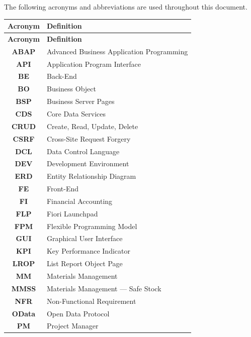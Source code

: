 \documentclass[12pt,a4paper]{report}
\begin{document}
The following acronyms and abbreviations are used throughout this document.

\begin{longtable}{|c|p{10cm}|}
  \hline
  \rowcolor{tableheadpeach}
  \textbf{Acronym} & \textbf{Definition} \\
  \hline
  \endfirsthead
  \hline
  \rowcolor{tableheadpeach}
  \textbf{Acronym} & \textbf{Definition} \\
  \hline
  \endhead
  \hline
  \endfoot
  \textbf{ABAP}  & Advanced Business Application Programming \\ \hline
  \textbf{API}   & Application Program Interface \\ \hline
  \textbf{BE}    & Back-End \\ \hline
  \textbf{BO}    & Business Object \\ \hline
  \textbf{BSP}   & Business Server Pages \\ \hline
  \textbf{CDS}   & Core Data Services \\ \hline
  \textbf{CRUD}  & Create, Read, Update, Delete \\ \hline
  \textbf{CSRF}  & Cross-Site Request Forgery \\ \hline
  \textbf{DCL}   & Data Control Language \\ \hline
  \textbf{DEV}   & Development Environment \\ \hline
  \textbf{ERD}   & Entity Relationship Diagram \\ \hline
  \textbf{FE}    & Front-End \\ \hline
  \textbf{FI}    & Financial Accounting \\ \hline
  \textbf{FLP}   & Fiori Launchpad \\ \hline
  \textbf{FPM}   & Flexible Programming Model \\ \hline
  \textbf{GUI}   & Graphical User Interface \\ \hline
  \textbf{KPI}   & Key Performance Indicator \\ \hline
  \textbf{LROP}  & List Report Object Page \\ \hline
  \textbf{MM}    & Materials Management \\ \hline
  \textbf{MMSS}  & Materials Management --- Safe Stock \\ \hline
  \textbf{NFR}   & Non-Functional Requirement \\ \hline
  \textbf{OData} & Open Data Protocol \\ \hline
  \textbf{PM}    & Project Manager \\ \hline

\end{longtable}
\end{document}
